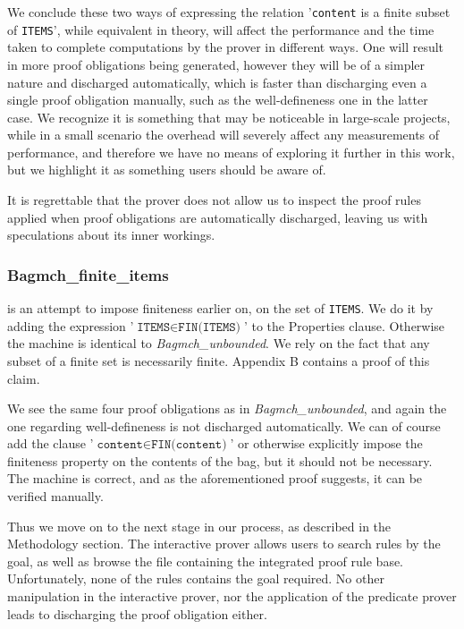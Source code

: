 \documentclass[12pt,journal,duplex]{IEEEtran}
\begin{document}
	We conclude these two ways of expressing the relation '\texttt{content} is a finite subset of \texttt{ITEMS}', while equivalent in theory, will affect the performance and the time taken to complete computations by the prover in different ways. One will result in more proof obligations being generated, however they will be of a simpler nature and discharged automatically, which is faster than discharging even a single proof obligation manually, such as the well-defineness one in the latter case. We recognize it is something that may be noticeable in large-scale projects, while in a small scenario the overhead will severely affect any measurements of performance, and therefore we have no means of exploring it further in this work, but we highlight it as something users should be aware of.

	It is regrettable that the prover does not allow us to inspect the proof rules applied when proof obligations are automatically discharged, leaving us with speculations about its inner workings.

	\subsubsection{Bagmch\_finite\_items} is an attempt to impose finiteness earlier on, on the set of \texttt{ITEMS}. We do it by adding the expression '$\texttt{ITEMS} \in \texttt{FIN(ITEMS)}$' to the Properties clause. Otherwise the machine is identical to \emph{Bagmch\_unbounded}. We rely on the fact that any subset of a finite set is necessarily finite. Appendix B contains a proof of this claim.

	We see the same four proof obligations as in \emph{Bagmch\_unbounded}, and again the one regarding well-defineness is not discharged automatically. We can of course add the clause '$\texttt{content} \in \texttt{FIN(content)}$' or otherwise explicitly impose the finiteness property on the contents of the bag, but it should not be necessary. The machine is correct, and as the aforementioned proof suggests, it can be verified manually.

	Thus we move on to the next stage in our process, as described in the Methodology section. The interactive prover allows users to search rules by the goal, as well as browse the file containing the integrated proof rule base. Unfortunately, none of the rules contains the goal required. No other manipulation in the interactive prover, nor the application of the predicate prover leads to discharging the proof obligation either.
\end{document}
